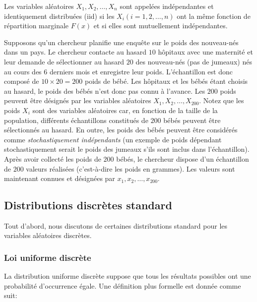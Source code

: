 {\theoremstyle{definition}
\begin{definition}
    Les variables aléatoires $X_1, X_2,\dots, X_n$ sont appelées indépendantes et identiquement distribuées (iid) si
    les  $X_i (i = 1,2,\dots, n)$ ont la même fonction de répartition marginale $F (x)$ et si elles sont mutuellement
    indépendantes.
\end{definition}

\begin{example}
    Supposons qu'un chercheur planifie une enquête sur le poids des nouveau-nés dans un pays. Le chercheur contacte au
    hasard $10$ hôpitaux avec une maternité et leur demande de sélectionner au hasard $20$ des nouveau-nés (pas de
    jumeaux) nés au cours des $6$ derniers mois et enregistre leur poids. L'échantillon est donc composé
    de $10 \times 20 = 200$ poids de bébé. Les hôpitaux et les bébés étant choisis au hasard, le poids des bébés n'est
    donc pas connu à l'avance. Les $200$ poids peuvent être désignés par les variables aléatoires $X_1, X_2,\dots, X_{200}$.
    Notez que les poids $X_i$ sont des variables aléatoires car, en fonction de la taille de la population, différents
    échantillons constitués de $200$ bébés peuvent être sélectionnés au hasard. En outre, les poids des bébés peuvent
    être considérés comme \textit{stochastiquement indépendants} (un exemple de poids dépendant stochastiquement serait
    le poids des jumeaux s’ils sont inclus dans l’échantillon). Après avoir collecté les poids de $200$ bébés, le
    chercheur dispose d'un échantillon de $200$ valeurs réalisées (c'est-à-dire les poids en grammes). Les valeurs
    sont maintenant connues et désignées par $x_1, x_2,\dots, x_{200}$.
\end{example}

\subsection{Distributions discrètes standard}

Tout d'abord, nous discutons de certaines distributions standard pour les variables aléatoires discrètes.

\subsubsection{Loi uniforme discrète}

La distribution uniforme discrète suppose que tous les résultats possibles ont une probabilité d'occurrence
égale. Une définition plus formelle est donnée comme suit:

}
